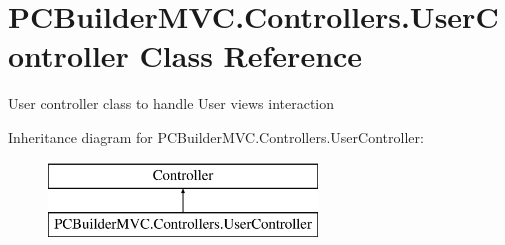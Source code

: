\hypertarget{class_p_c_builder_m_v_c_1_1_controllers_1_1_user_controller}{}\section{P\+C\+Builder\+M\+V\+C.\+Controllers.\+User\+Controller Class Reference}
\label{class_p_c_builder_m_v_c_1_1_controllers_1_1_user_controller}


User controller class to handle User views interaction  


Inheritance diagram for P\+C\+Builder\+M\+V\+C.\+Controllers.\+User\+Controller\+:\begin{figure}[H]
\begin{center}
\leavevmode
\includegraphics[height=2.000000cm]{class_p_c_builder_m_v_c_1_1_controllers_1_1_user_controller}
\end{center}
\end{figure}

